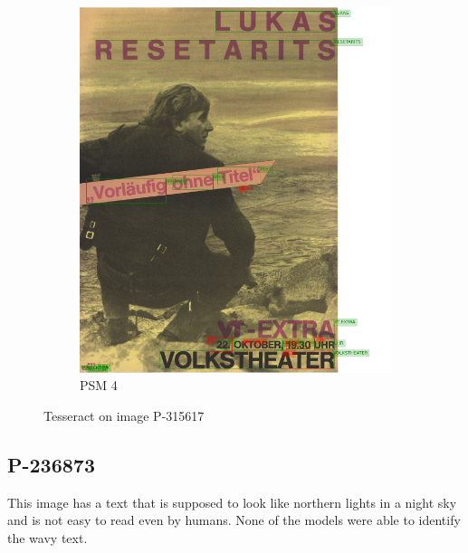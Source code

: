 \begin{figure}[hbtp!]
    \begin{subfigure}{\textwidth}
        \centering
        \includegraphics[scale=0.29]{obrazky/plakaty/result_tesseract_vienna2_split_psm4-83.png}
        \caption{PSM 4}
        \label{Im4:ex:tess4}
    \end{subfigure}

    \caption{Tesseract  on image P-315617}
    \label{Im3:ex:tess}
\end{figure}

\newpage
\subsection*{P-236873}

This image has a text that is supposed to look like northern lights in a night sky and is not easy to read even by humans. None of the models were able to identify the wavy text.


